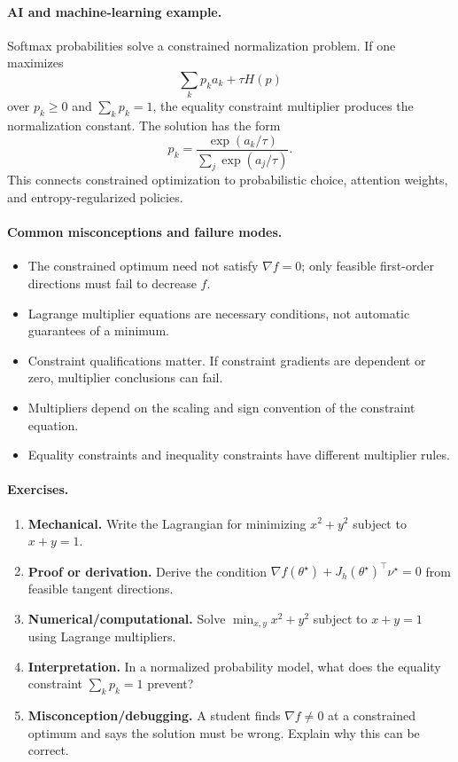\paragraph{AI and machine-learning example.}
Softmax probabilities solve a constrained normalization problem. If one maximizes
\[
\sum_k p_k a_k+\tau H(p)
\]
over \(p_k\ge 0\) and \(\sum_k p_k=1\), the equality constraint multiplier produces the normalization constant. The solution has the form
\[
p_k=\frac{\exp(a_k/\tau)}{\sum_j\exp(a_j/\tau)}.
\]
This connects constrained optimization to probabilistic choice, attention weights, and entropy-regularized policies.

\paragraph{Common misconceptions and failure modes.}
\begin{itemize}[leftmargin=*]
\item The constrained optimum need not satisfy \(\nabla f=0\); only feasible first-order directions must fail to decrease \(f\).
\item Lagrange multiplier equations are necessary conditions, not automatic guarantees of a minimum.
\item Constraint qualifications matter. If constraint gradients are dependent or zero, multiplier conclusions can fail.
\item Multipliers depend on the scaling and sign convention of the constraint equation.
\item Equality constraints and inequality constraints have different multiplier rules.
\end{itemize}

\paragraph{Exercises.}
\begin{enumerate}[label=\textbf{22.1.\arabic*.}, leftmargin=*]
\item \textbf{Mechanical.} Write the Lagrangian for minimizing \(x^2+y^2\) subject to \(x+y=1\).
\item \textbf{Proof or derivation.} Derive the condition \(\nabla f(\theta^\star)+J_h(\theta^\star)^\top\nu^\star=0\) from feasible tangent directions.
\item \textbf{Numerical/computational.} Solve \(\min_{x,y}x^2+y^2\) subject to \(x+y=1\) using Lagrange multipliers.
\item \textbf{Interpretation.} In a normalized probability model, what does the equality constraint \(\sum_k p_k=1\) prevent?
\item \textbf{Misconception/debugging.} A student finds \(\nabla f\neq 0\) at a constrained optimum and says the solution must be wrong. Explain why this can be correct.
\end{enumerate}

